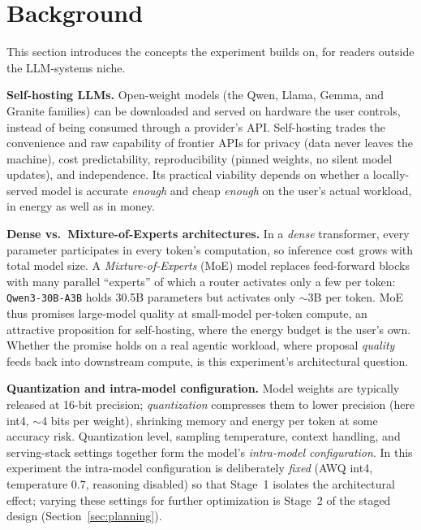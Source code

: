 \section{Background}\label{sec:background}

This section introduces the concepts the experiment builds on, for readers outside the LLM-systems niche.

\textbf{Self-hosting LLMs.} Open-weight models (\eg the Qwen, Llama, Gemma, and Granite families) can be downloaded and served on hardware the user controls, instead of being consumed through a provider's API. Self-hosting trades the convenience and raw capability of frontier APIs for privacy (data never leaves the machine), cost predictability, reproducibility (pinned weights, no silent model updates), and independence. Its practical viability depends on whether a locally-served model is accurate \emph{enough} and cheap \emph{enough} on the user's actual workload, in energy as well as in money.

\textbf{Dense vs.\ Mixture-of-Experts architectures.} In a \emph{dense} transformer, every parameter participates in every token's computation, so inference cost grows with total model size. A \emph{Mixture-of-Experts} (MoE) model replaces feed-forward blocks with many parallel ``experts'' of which a router activates only a few per token: \texttt{Qwen3-30B-A3B} holds 30.5B parameters but activates only $\sim$3B per token. MoE thus promises large-model quality at small-model per-token compute, an attractive proposition for self-hosting, where the energy budget is the user's own. Whether the promise holds on a real agentic workload, where proposal \emph{quality} feeds back into downstream compute, is this experiment's architectural question.

\textbf{Quantization and intra-model configuration.} Model weights are typically released at 16-bit precision; \emph{quantization} compresses them to lower precision (here int4, $\sim$4 bits per weight), shrinking memory and energy per token at some accuracy risk. Quantization level, sampling temperature, context handling, and serving-stack settings together form the model's \emph{intra-model configuration}. In this experiment the intra-model configuration is deliberately \emph{fixed} (AWQ int4, temperature 0.7, reasoning disabled) so that Stage~1 isolates the architectural effect; varying these settings for further optimization is Stage~2 of the staged design (Section~\ref{sec:planning}).

